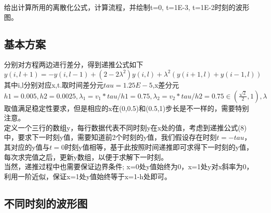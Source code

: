 \documentclass[11pt]{ctexart}
\begin{document}
给出计算所用的离散化公式，计算流程，并绘制t=0, t=1E-3, t=1E-2时刻的波形图。

\subsection{基本方案}

分别对方程两边进行差分，得到递推公式如下
\begin{equation}
y(i,l+1)=-y(i,l-1)+(2-2\lambda^{2})y(i,l)+\lambda^{2}(y(i+1,l)+y(i-1,l))
\end{equation}
\indent 其中i,l分别对应x,t.取时间差分元$tau=1.25E-5$,x差分元$h1=0.005,h2=0.0025,\lambda_{1}=v_{1}*tau/h1=0.75,\lambda_{2}=v_{2}*tau/h2=0.75\in(\frac{\sqrt{2}}{2},1),\lambda$取值满足稳定性要求，但是相应的x在(0,0.5)和(0.5,1)步长是不一样的，需要特别注意。\\
\indent 定义一个三行的数组y，每行数据代表不同时刻y在x处的值，考虑到递推公式(8)中，要求下一时刻y值，需要知道前2个时刻的y值，我们假设存在时刻$t=-tau$，其对应的y值与$t=0$时刻y值相等，基于此按照时间递推即可求得下一时刻的y值，每次求完值之后，更新y数组，以便于求解下一时刻。\\
\indent 当然，递推过程中也需要保证边界条件; x=0处y值始终为0，x=1处y对x斜率为0，利用一阶近似，保证x=1处y值始终等于x=1-h处即可。

\subsection{不同时刻的波形图}
\end{document}
